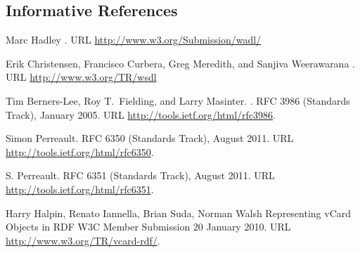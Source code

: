 \subsection*{Informative References}

\begin{thebibliography}{10}
\vspace*{-3em}

Marc Hadley
.
\newblock URL \url{http://www.w3.org/Submission/wadl/}

Erik Christensen, Francisco Curbera, Greg Meredith, and Sanjiva Weerawarana
.
\newblock URL \url{http://www.w3.org/TR/wsdl}

Tim Berners-Lee, Roy T.\ Fielding, and Larry Masinter.
.
\newblock RFC 3986 (Standards Track), January 2005.
\newblock URL \url{http://tools.ietf.org/html/rfc3986}.

Simon Perreault.
\newblock RFC 6350 (Standards Track), August 2011.
\newblock URL \url{http://tools.ietf.org/html/rfc6350}.

S. Perreault.
\newblock RFC 6351 (Standards Track), August 2011.
\newblock URL \url{http://tools.ietf.org/html/rfc6351}.

 Harry Halpin, Renato Iannella, Brian Suda, Norman Walsh
\newblock Representing vCard Objects in RDF
\newblock W3C Member Submission 20 January 2010.
\newblock URL \url{http://www.w3.org/TR/vcard-rdf/}.



\end{thebibliography}
